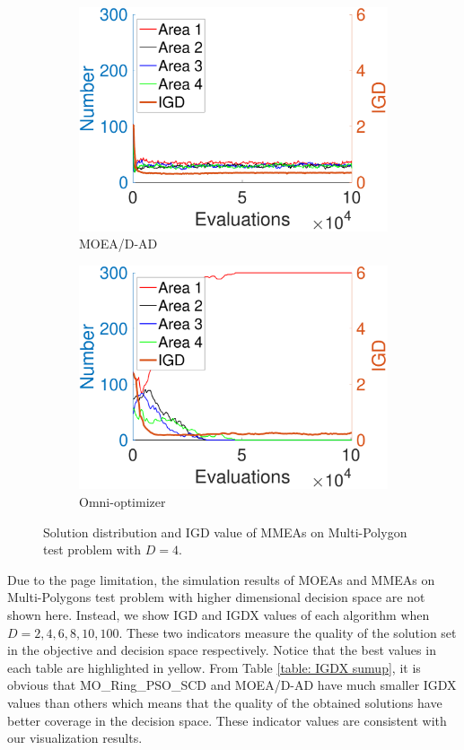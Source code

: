 \documentclass[conference]{IEEEtran}
\begin{document}
\begin{figure}[htbp]
    \begin{subfigure}[b]{.24\textwidth}
    \includegraphics[width=\linewidth]{Section5/dim4/Diversity/MOEADAD}
    \caption{MOEA/D-AD}
    \end{subfigure}
    \begin{subfigure}[b]{.24\textwidth}
    \includegraphics[width=\linewidth]{Section5/dim4/Diversity/OmniOptimizer}
    \caption{Omni-optimizer}
    \end{subfigure}
    \caption{Solution distribution and IGD value of MMEAs on Multi-Polygon test problem with $D=4$.}
    \label{fig: MMEAs Diversity dim=4}
\end{figure}

Due to the page limitation, the simulation results of MOEAs and MMEAs on Multi-Polygons test problem with higher dimensional decision space are not shown here. Instead, we show IGD and IGDX\cite{Liang2016} values of each algorithm when $D=2, 4, 6, 8, 10, 100$. These two indicators measure the quality of the solution set in the objective and decision space respectively. Notice that the best values in each table are highlighted in yellow. From Table \ref{table: IGDX sumup}, it is obvious that MO\_Ring\_PSO\_SCD and MOEA/D-AD have much smaller IGDX values than others which means that the quality of the obtained solutions have better coverage in the decision space. These indicator values are consistent with our visualization results.
\end{document}
